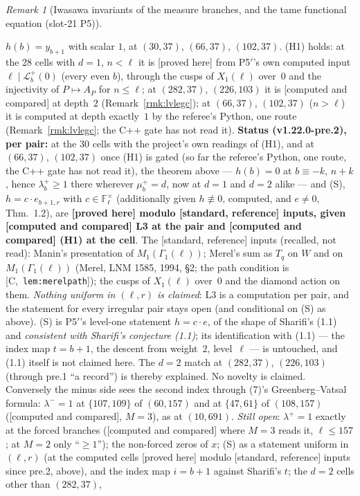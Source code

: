 \documentclass[11pt]{article}
\theoremstyle{remark}
\newtheorem{remark}[theorem]{Remark}
\newcommand{\F}{\mathbb{F}}
\newcommand{\HA}[1]{[C,~\texttt{#1}]}      %
\newcommand{\PROVED}{\textsf{[proved here]}}
\newcommand{\STD}{\textsf{[standard, reference]}}
\newcommand{\CMPD}{\textsf{[computed and compared]}}   %
\begin{document}
\begin{remark}[Iwasawa invariants of the measure branches, and the tame functional equation (slot-21 P5)]
\begin{enumerate}
  $h(b)=y_{b+1}$ with scalar $1$, at $(30,37)$, $(66,37)$, $(102,37)$. (H1) holds: at the $28$ cells with $d=1$, $n<\ell$ it is \PROVED{} from P5$'$'s own computed input $\ell\mid\mathcal L^{+}_b(0)$ (every even $b$), through the cusps of $X_1(\ell)$
  over~$0$ and the injectivity of $P\mapsto A_P$ for $n\le\ell$; at $(282,37)$, $(226,103)$ it is \CMPD{} at depth~$2$ (Remark~\ref{rmk:lvlegc}); at $(66,37)$, $(102,37)$ ($n>\ell$) it is computed at depth exactly~$1$ by the
  referee's Python, one route (Remark~\ref{rmk:lvlegc}; the C++ gate has not read it). \textbf{Status (v1.22.0-pre.2), per pair:} at the $30$ cells with the project's own readings of (H1), and at $(66,37)$, $(102,37)$ once (H1) is gated (so far the referee's Python, one route, the C++ gate has not read it), the theorem above --- $h(b)=0$ at $b\equiv-k,\,n+k$, hence $\lambda^{+}_b\ge1$ there wherever $\mu^{+}_b=d$, now at $d=1$ and $d=2$ alike --- and (S), $h=c\cdot e_{b+1,r}$ with $c\in\F_\ell^{\times}$ (additionally given $h\not\equiv0$, computed, and
  $e\neq0$, \cite{sharifi_eisenstein} Thm.~1.2), are \textbf{\PROVED{} modulo \STD{} inputs, given \CMPD{} L3 at the pair and \CMPD{} (H1) at the cell}. The \STD{} inputs (recalled, not read): Manin's presentation of $M_1(\Gamma_1(\ell))$;
  Merel's sum as $T_q$ on $W$ and on $M_1(\Gamma_1(\ell))$ (Merel, LNM 1585, 1994, \S2; the path condition is \HA{lem:merelpath}); the cusps of $X_1(\ell)$ over~$0$ and the diamond action on them. \emph{Nothing uniform in $(\ell,r)$ is
  claimed}: L3 is a computation per pair, and the statement for every irregular pair stays open (and conditional on (S) as above). (S) is P5$'$'s level-one statement $h=c\cdot e$, of the shape of Sharifi's (1.1) and
  \emph{consistent with Sharifi's conjecture (1.1)}; its identification with (1.1) --- the index map $t=b+1$, the descent from weight~$2$, level~$\ell$ --- is untouched, and (1.1) itself is not claimed here.
  The $d=2$ match at $(282,37)$, $(226,103)$ (through pre.1 ``a record'') is thereby explained. No novelty is claimed.
  Conversely the minus side sees the second index through (7)'s Greenberg--Vatsal formula: $\lambda^{-}=1$ at
  $\{107,109\}$ of $(60,157)$ and at $\{47,61\}$ of $(108,157)$ (\CMPD, $M=3$), as at $(10,691)$. \emph{Still open}: $\lambda^{+}=1$ exactly at the forced branches (\CMPD{} where $M=3$ reads it, $\ell\le157$;
  at $M=2$ only ``$\ge1$''); the non-forced zeros of $x$; (S) as a statement uniform in $(\ell,r)$ (at the computed cells \PROVED{} modulo \STD{} inputs since pre.2, above), and the index map $i=b+1$ against Sharifi's $t$; the $d=2$ cells other than $(282,37)$,

\end{enumerate}
\end{remark}
\end{document}
